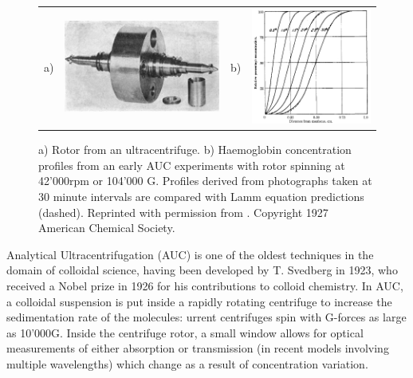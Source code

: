 \documentclass[physics]{doctoral}
\begin{document}
\begin{figure}[h]
    \centering
    \begin{tabular}{llll}
        a)                                                                                      &
        \includegraphics[height=0.3\linewidth,valign=t]{figures/ultracentrifugation_device.png} &
        b)                                                                                      &
        \includegraphics[height=0.3\linewidth,valign=t]{figures/ultracentrifugation_results.png}
    \end{tabular}

    \caption{a) Rotor from an ultracentrifuge. b) Haemoglobin concentration profiles from an early AUC experiments with rotor spinning at 42'000rpm or 104'000 G.
        Profiles derived from photographs taken at 30 minute intervals are compared with Lamm equation predictions (dashed).
        Reprinted with permission from \cite{Svedberg_1927}.
        Copyright 1927 American Chemical Society.
    }
    \label{fig:auc_diagram}
\end{figure}

Analytical Ultracentrifugation (AUC) is one of the oldest techniques in the domain of colloidal science, having been developed by T.
Svedberg in 1923, who received a Nobel prize in 1926 for his contributions to colloid chemistry.
In AUC, a colloidal suspension is put inside a rapidly rotating centrifuge to increase the sedimentation rate of the molecules: urrent centrifuges spin with G-forces as large as 10'000G.
Inside the centrifuge rotor, a small window allows for optical measurements of either absorption or transmission (in recent models involving multiple wavelengths) which change as a result of concentration variation.
\end{document}
